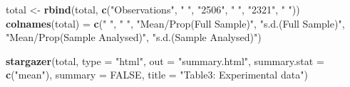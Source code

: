 \documentclass[]{tufte-handout}
\newenvironment{Shaded}{\begin{snugshade}}{\end{snugshade}}
\newcommand{\KeywordTok}[1]{\textcolor[rgb]{0.13,0.29,0.53}{\textbf{#1}}}
\newcommand{\DataTypeTok}[1]{\textcolor[rgb]{0.13,0.29,0.53}{#1}}
\newcommand{\DecValTok}[1]{\textcolor[rgb]{0.00,0.00,0.81}{#1}}
\newcommand{\StringTok}[1]{\textcolor[rgb]{0.31,0.60,0.02}{#1}}
\newcommand{\OtherTok}[1]{\textcolor[rgb]{0.56,0.35,0.01}{#1}}
\newcommand{\OperatorTok}[1]{\textcolor[rgb]{0.81,0.36,0.00}{\textbf{#1}}}
\newcommand{\NormalTok}[1]{#1}
\begin{document}
\begin{Shaded}
\begin{Highlighting}[]
\NormalTok{total <-}\StringTok{ }\KeywordTok{rbind}\NormalTok{(total, }\KeywordTok{c}\NormalTok{(}\StringTok{"Observations"}\NormalTok{, }\StringTok{" "}\NormalTok{, }\StringTok{"2506"}\NormalTok{, }
    \StringTok{" "}\NormalTok{, }\StringTok{"2321"}\NormalTok{, }\StringTok{" "}\NormalTok{))}
\KeywordTok{colnames}\NormalTok{(total) =}\StringTok{ }\KeywordTok{c}\NormalTok{(}\StringTok{" "}\NormalTok{, }\StringTok{"  "}\NormalTok{, }\StringTok{"Mean/Prop(Full Sample)"}\NormalTok{, }
    \StringTok{"s.d.(Full Sample)"}\NormalTok{, }\StringTok{"Mean/Prop(Sample Analysed)"}\NormalTok{, }
    \StringTok{"s.d.(Sample Analysed)"}\NormalTok{)}
\end{Highlighting}
\end{Shaded}

\begin{Shaded}
\end{Shaded}

\begin{Shaded}
\begin{Highlighting}[]
\KeywordTok{stargazer}\NormalTok{(total, }\DataTypeTok{type =} \StringTok{"html"}\NormalTok{, }\DataTypeTok{out =} \StringTok{"summary.html"}\NormalTok{, }
    \DataTypeTok{summary.stat =} \KeywordTok{c}\NormalTok{(}\StringTok{"mean"}\NormalTok{), }\DataTypeTok{summary =} \OtherTok{FALSE}\NormalTok{, }
    \DataTypeTok{title =} \StringTok{"Table3: Experimental data"}\NormalTok{)}
\end{Highlighting}
\end{Shaded}
\end{document}
